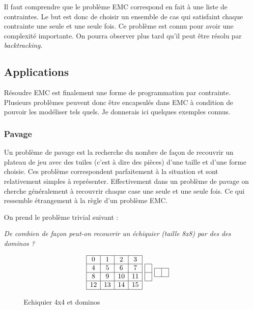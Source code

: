 \documentclass[a4paper]{article}
\begin{document}
Il faut comprendre que le problème EMC correspond en fait à une liste de 
contraintes. Le but est donc de choisir un ensemble de cas qui satisfaint 
chaque contrainte une seule et une seule fois.
Ce problème est connu pour avoir une complexité importante. On pourra observer 
plus tard qu'il peut être résolu par \emph{backtracking}.



\subsection{Applications}

Résoudre EMC est finalement une forme de programmation par contrainte. 
Plusieurs problèmes peuvent donc être encapsulés dans EMC à 
condition de pouvoir les modéliser tels quels. Je donnerais ici quelques 
exemples connus.


\subsubsection{Pavage}
Un problème de pavage est la recherche du nombre de façon de recouvrir un
plateau de jeu avec des tuiles (c'est à dire des pièces) d'une taille et d'une
forme choisie. 
Ces problème correspondent parfaitement à la situation
et sont relativement simples à représenter. 
Effectivement dans un problème
de pavage on cherche généralement à recouvrir chaque case une seule et une 
seule fois. Ce qui ressemble étrangement à la règle d'un problème EMC.

\newpage
On prend le problème trivial suivant : 

\emph{De combien de façon peut-on recouvrir un échiquier (taille 8x8) par des 
des dominos ?}
\\

\begin{figure}
\centering
{}
\caption{\label{chessboard4x4} Echiquier 4x4 et dominos}
\[
  \begin{array}{|c|c|c|c|}
		\hline
   	0 & 1 & 2 & 3 \\
		\hline
    4	& 5 & 6 & 7 \\
		\hline
   	8 & 9 & 10 & 11 \\
		\hline
   	12 & 13 & 14 & 15 \\
		\hline
\end{array}
	\textrm{ }
\begin{array}{ |c| }
	\hline
		\\
	\hline
    \\
	\hline
  \end{array}
	\textrm{ }
\begin{array}{ |c|c| }
	\hline
		& \\ 
	\hline
  \end{array}
\]
\end{figure}
\end{document}
